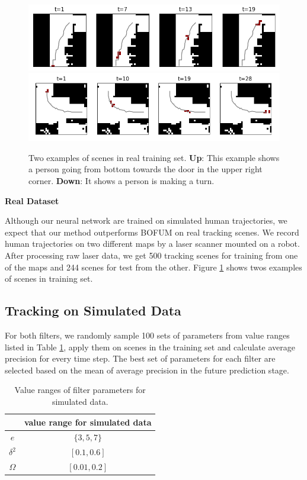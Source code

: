 \begin{figure}[hp]
    \includegraphics[width=.98\textwidth]{figures/real_dataset_1_persons_1_crop.png}
    \includegraphics[width=\textwidth]{figures/real_dataset_1_persons_crop.png}
    \caption[Two examples of scenes in real training set.]{Two examples of scenes in real training set. \textbf{Up}: This example shows a person going from bottom towards the door in the upper right corner. \textbf{Down}: It shows a person is making a turn. }
    \label{fig:sample_scene_real}


\end{figure}


\textbf{Real Dataset}

Although our neural network are trained on simulated human trajectories, we expect that our method outperforms BOFUM on real tracking scenes. We record human trajectories on two different maps by a laser scanner mounted on a robot. After processing raw laser data, we get 500 tracking scenes for training from one of the maps and 244 scenes for test from the other. Figure \ref{fig:sample_scene_real} shows twos examples of scenes in training set.

\subsection{Tracking on Simulated Data}

For both filters, we randomly sample 100 sets of parameters from value ranges listed in Table \ref{table:param_range_simulated}, apply them on scenes in the training set and calculate average precision for every time step. The best set of parameters for each filter are selected based on the mean of average precision in the future prediction stage. 

\begin{table}[H]
\centering
  \begin{tabular}{c|c}
    \hline
     &   value range for simulated data \\ \hline
    \( e \) & \( \{3, 5, 7\} \) \\
    \(  \delta^2\) & \( [0.1, 0.6]\) \\   
   \( \Omega \) & \( [0.01, 0.2] \) \\
   \hline
 \end{tabular}
\caption{Value ranges of filter parameters for simulated data.}
\label{table:param_range_simulated}
\end{table}


